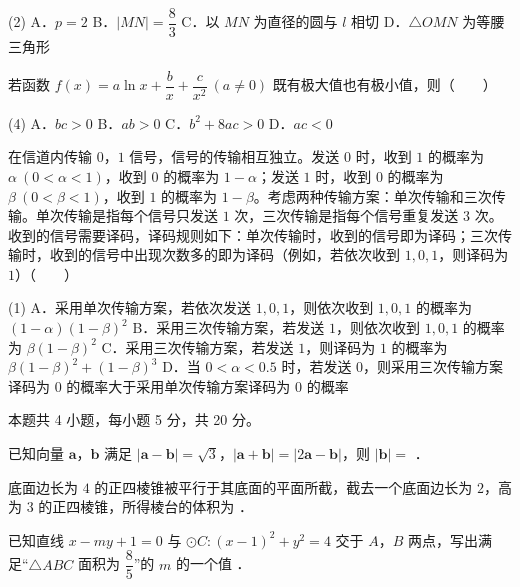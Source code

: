 \begin{gkopts}(2)
\task A．$p=2$
\task B．$|MN|=\dfrac83$
\task C．以 $MN$ 为直径的圆与 $l$ 相切
\task D．$\triangle OMN$ 为等腰三角形
\end{gkopts}

若函数 $f(x)=a\ln x+\dfrac bx+\dfrac c{x^{2}}\ (a\ne0)$ 既有极大值也有极小值，则（　　）

\begin{gkopts}(4)
\task A．$bc>0$
\task B．$ab>0$
\task C．$b^{2}+8ac>0$
\task D．$ac<0$
\end{gkopts}

在信道内传输 $0$，$1$ 信号，信号的传输相互独立。发送 $0$ 时，收到 $1$ 的概率为 $\alpha\ (0<\alpha<1)$，收到 $0$ 的概率为 $1-\alpha$；发送 $1$ 时，收到 $0$ 的概率为 $\beta\ (0<\beta<1)$，收到 $1$ 的概率为 $1-\beta$。考虑两种传输方案：单次传输和三次传输。单次传输是指每个信号只发送 $1$ 次，三次传输是指每个信号重复发送 $3$ 次。收到的信号需要译码，译码规则如下：单次传输时，收到的信号即为译码；三次传输时，收到的信号中出现次数多的即为译码（例如，若依次收到 $1,0,1$，则译码为 $1$）（　　）

\begin{gkopts}(1)
\task A．采用单次传输方案，若依次发送 $1,0,1$，则依次收到 $1,0,1$ 的概率为 $(1-\alpha)(1-\beta)^{2}$
\task B．采用三次传输方案，若发送 $1$，则依次收到 $1,0,1$ 的概率为 $\beta(1-\beta)^{2}$
\task C．采用三次传输方案，若发送 $1$，则译码为 $1$ 的概率为 $\beta(1-\beta)^{2}+(1-\beta)^{3}$
\task D．当 $0<\alpha<0.5$ 时，若发送 $0$，则采用三次传输方案译码为 $0$ 的概率大于采用单次传输方案译码为 $0$ 的概率
\end{gkopts}

\par\medskip


\begin{gktip}
本题共 4 小题，每小题 5 分，共 20 分。
\end{gktip}

已知向量 $\boldsymbol a$，$\boldsymbol b$ 满足 $|\boldsymbol a-\boldsymbol b|=\sqrt3$，$|\boldsymbol a+\boldsymbol b|=|2\boldsymbol a-\boldsymbol b|$，则 $|\boldsymbol b|=$ \gkblank{}．

底面边长为 $4$ 的正四棱锥被平行于其底面的平面所截，截去一个底面边长为 $2$，高为 $3$ 的正四棱锥，所得棱台的体积为 \gkblank{}．

已知直线 $x-my+1=0$ 与 $\odot C:(x-1)^{2}+y^{2}=4$ 交于 $A$，$B$ 两点，写出满足“$\triangle ABC$ 面积为 $\dfrac85$”的 $m$ 的一个值 \gkblank{}．

